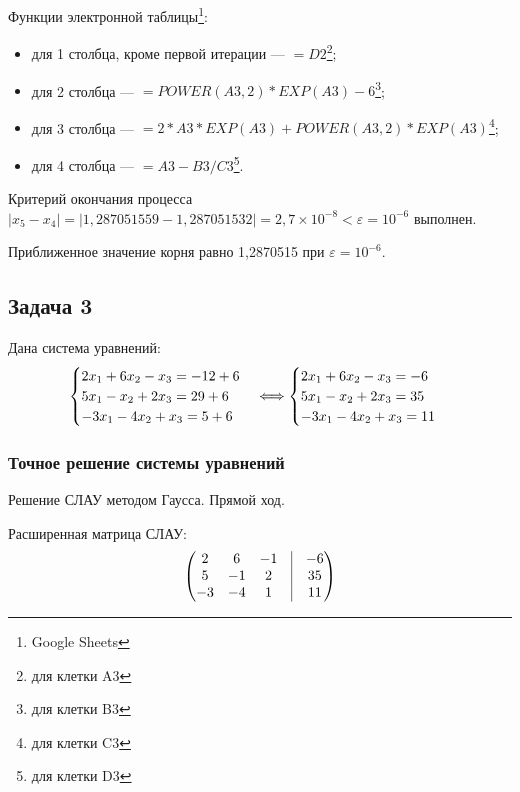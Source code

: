 \documentclass[10pt, a4paper, titlepage]{article}
\begin{document}
Функции электронной таблицы\footnote{Google Sheets}:
\begin{itemize}
    \item для 1 столбца, кроме первой итерации --- $=D2$\footnote{для клетки A3};
    
    \item для 2 столбца --- $=POWER(A3,2)*EXP(A3)-6$\footnote{для клетки B3};
    
    \item для 3 столбца --- $=2*A3*EXP(A3)+POWER(A3,2)*EXP(A3)$\footnote{для клетки C3};
    
    \item для 4 столбца --- $=A3-B3/C3$\footnote{для клетки D3}.
\end{itemize}

Критерий окончания процесса $|x_5-x_4|=|1,287051559-1,287051532 |=2,7\times10^{-8}<\varepsilon=10^{-6}$ выполнен. 

Приближенное значение корня равно 1,2870515 при $\varepsilon=10^{-6}$.

\subsection{Задача 3}

Дана система уравнений:
\begin{equation*}
    \begin{cases}
        $$2x_1+6x_2-x_3=-12+6$$ \\
        $$5x_1-x_2+2x_3=29+6$$ \\
        $$-3x_1-4x_2+x_3=5+6$$
    \end{cases}
    \Longleftrightarrow
    \begin{cases}
        $$2x_1+6x_2-x_3=-6$$ \\
        $$5x_1-x_2+2x_3=35$$ \\
        $$-3x_1-4x_2+x_3=11$$
    \end{cases}
\end{equation*}


\subsubsection*{Точное решение системы уравнений}

Решение СЛАУ методом Гаусса. Прямой ход.

Расширенная матрица СЛАУ:
\begin{equation*}
    \begin{pmatrix}
        2 & 6 & -1 & \vrule & -6 \\
        5 & -1 & 2 & \vrule & 35 \\
        -3 & -4 & 1 & \vrule & 11
    \end{pmatrix}
\end{equation*}
\end{document}
